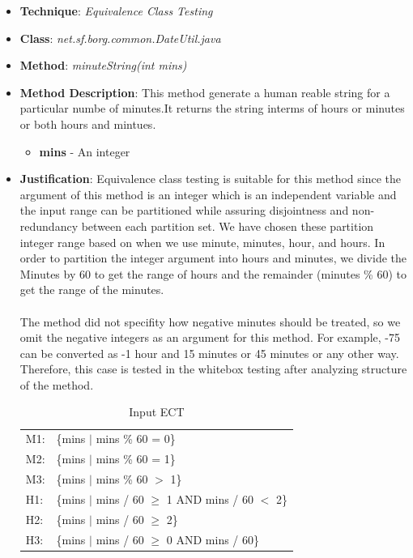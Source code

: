 \documentclass[fontsize=12pt,paper=letter,twoside]{scrartcl}
\begin{document}
\begin{itemize}
\item \textbf{Technique}: \emph{Equivalence Class Testing}
\item \textbf{Class}: \emph{net.sf.borg.common.DateUtil.java}
\item \textbf{Method}: \emph{minuteString(int mins)}
\item \textbf{Method Description}:
This method generate a human reable string for a particular numbe of minutes.It returns the string interms of hours or minutes or both hours and mintues.
\begin{itemize}
\item \textbf{mins} - An integer
\end{itemize}
\item \textbf{Justification}: Equivalence class testing is suitable for this method since the argument of this method is an integer which is an independent variable and the input range can be partitioned while assuring disjointness and non-redundancy between each partition set. We have chosen these partition integer range based on when we use minute, minutes, hour, and hours. In order to partition the integer argument into hours and minutes, we divide the Minutes by 60 to get the range of hours and the remainder (minutes \% 60) to get the range of the minutes. \\ \\ The method did not specifity how negative minutes should be treated, so we omit the negative integers as an argument for this method. For example, -75 can be converted as -1 hour and 15 minutes or 45 minutes or any other way. Therefore, this case is tested in the whitebox testing after analyzing structure of the method.


\newpage
\begin{table}[!htb]
\caption{Input ECT}
\label{input-ectl}
\begin{tabular}{ll}
M1: & \{mins $|$ mins \% 60 = 0\}                                    \\
M2: & \{mins $|$ mins \% 60 = 1\}                                    \\
M3: & \{mins $|$ mins \% 60 $>$  1\}                         \\
H1: & \{mins $|$ mins / 60 $\geq$ 1 AND mins / 60 $<$ 2\} \\
H2: & \{mins $|$ mins / 60 $\geq$ 2\}                         \\
H3: & \{mins $|$ mins / 60 $\geq$ 0 AND mins / 60\}                                   \\
\end{tabular}
\end{table}


\end{itemize}
\end{document}

